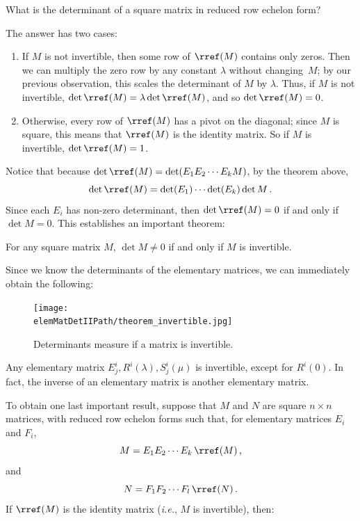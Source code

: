 \begin{center}
What is the determinant of a square matrix in reduced row echelon form?  
\end{center}
The answer has two cases:
\begin{enumerate}
\item If $M$ is not invertible, then some row of $\rref(M)$ contains only zeros.  Then we can multiply the zero row by any constant $\lambda$ without changing~$M$; by our previous observation, this scales the determinant of $M$ by $\lambda$.  Thus, if $M$ is not invertible, $\det \rref(M)=\lambda \det \rref(M)$, and so $\det \rref(M)=0$.  

\item Otherwise, every row of $\rref(M)$ has a pivot on the diagonal; since $M$ is square, this means that $\rref(M)$ is the identity matrix.  So if $M$ is invertible, $\det \rref(M)=1$.
\end{enumerate}
Notice that because $\det \rref(M) = \det (E_1E_2\cdots E_kM)$, by the theorem above, \[\det \rref(M)=\det (E_1) \cdots \det (E_k) \det M\, .\]  Since each $E_i$ has non-zero determinant, then $\det \rref(M)=0$ if and only if $\det M=0$.
This establishes an important theorem:


\begin{theorem}
\label{detinvertible}
For any square matrix $M$, $\det M\neq 0$ if and only if $M$ is invertible.
\end{theorem}
Since we know the determinants of the elementary matrices, we can immediately obtain the following:



\begin{figure}
\begin{center}
\texttt{[image: \\elemMatDetIIPath/theorem\_invertible.jpg]}
\end{center}
\caption{Determinants measure if a matrix is invertible.}
\end{figure}

\begin{corollary}
Any elementary matrix $E^i_j, R^i(\lambda), S^i_j(\mu)$ is invertible, except for $R^i(0)$.  In fact, the inverse of an elementary matrix is another elementary matrix.
\end{corollary}


To obtain one last important result, suppose that $M$ and $N$ are square $n\times n$ matrices, with reduced row echelon forms such that, for elementary matrices  $E_i$ and $F_i$, \[M=E_1E_2\cdots E_k \, \rref(M)\, ,\] and  \[N=F_1F_2\cdots F_l \, \rref(N)\, .\]  If $\rref(M)$ is the identity matrix ({\itshape i.e.}, $M$ is invertible), then:

